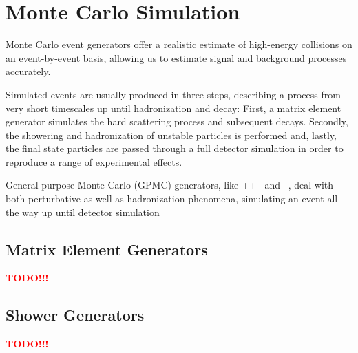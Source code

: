 \section{Monte Carlo Simulation}

Monte Carlo event generators offer a realistic estimate of high-energy collisions on an event-by-event basis, allowing us to estimate signal and background processes accurately.

Simulated events are usually produced in three steps, describing a process from very short timescales up until hadronization and decay:
First, a matrix element generator simulates the hard scattering process and subsequent decays. Secondly, the showering and hadronization of unstable particles is performed and, lastly, the final state particles are passed through a full detector simulation in order to reproduce a range of experimental effects.

General-purpose Monte Carlo (GPMC) generators, like \HERWIG++~\cite{Bahr:2008pv} and ~\cite{Sjostrand:2014zea}, deal with both perturbative as well as hadronization phenomena, simulating an event all the way up until detector simulation

%


\subsection{Matrix Element Generators}
\textcolor{red}{\textbf{TODO!!!}}
\subsection{Shower Generators}
\textcolor{red}{\textbf{TODO!!!}}
